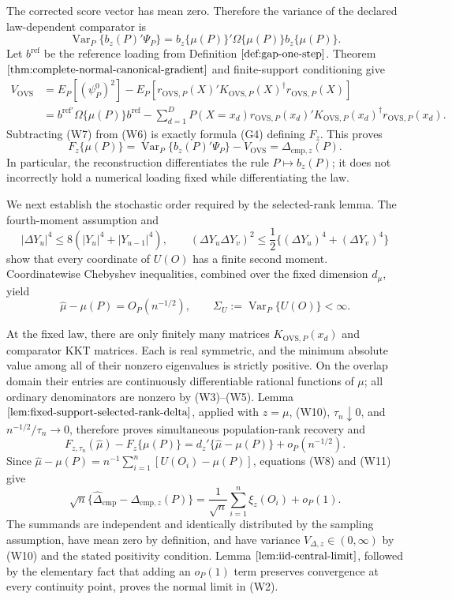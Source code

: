 The corrected score vector has mean zero.  Therefore the variance of the declared law-dependent comparator is
\[
 \operatorname{Var}_P\{b_z(P)'\Psi_P\}
 =b_z\{\mu(P)\}'\Omega\{\mu(P)\}b_z\{\mu(P)\}.
\tag{W6}
\]
Let \(b^{\mathrm{ref}}\) be the reference loading from Definition \(\ref{def:gap-one-step}\).  Theorem \(\ref{thm:complete-normal-canonical-gradient}\) and finite-support conditioning give
\[
 \begin{aligned}
 V_{\mathrm{OVS}}
 &=E_P[(\psi_P^0)^2]
 -E_P[r_{\mathrm{OVS},P}(X)'K_{\mathrm{OVS},P}(X)^\dagger
 r_{\mathrm{OVS},P}(X)]\\
 &=b^{\mathrm{ref}\prime}\Omega\{\mu(P)\}b^{\mathrm{ref}}
 -\sum_{d=1}^D P(X=x_d)
 r_{\mathrm{OVS},P}(x_d)'K_{\mathrm{OVS},P}(x_d)^\dagger
 r_{\mathrm{OVS},P}(x_d).
 \end{aligned}
\tag{W7}
\]
Subtracting (W7) from (W6) is exactly formula (G4) defining \(F_z\).  This proves
\[
 F_z\{\mu(P)\}
 =\operatorname{Var}_P\{b_z(P)'\Psi_P\}-V_{\mathrm{OVS}}
 =\Delta_{\mathrm{cmp},z}(P).
\tag{W8}
\]
In particular, the reconstruction differentiates the rule \(P\mapsto b_z(P)\); it does not incorrectly hold a numerical loading fixed while differentiating the law.

We next establish the stochastic order required by the selected-rank lemma.  The fourth-moment assumption and
\[
 |\Delta Y_u|^4\le 8(|Y_u|^4+|Y_{u-1}|^4),
 \qquad
 (\Delta Y_u\Delta Y_v)^2
 \le\frac12\{(\Delta Y_u)^4+(\Delta Y_v)^4\}
\tag{W9}
\]
show that every coordinate of \(U(O)\) has a finite second moment.  Coordinatewise Chebyshev inequalities, combined over the fixed dimension \(d_\mu\), yield
\[
 \widehat\mu-\mu(P)=O_P(n^{-1/2}),
 \qquad
 \Sigma_U:=\operatorname{Var}_P\{U(O)\}<\infty.
\tag{W10}
\]

At the fixed law, there are only finitely many matrices \(K_{\mathrm{OVS},P}(x_d)\) and comparator KKT matrices.  Each is real symmetric, and the minimum absolute value among all of their nonzero eigenvalues is strictly positive.  On the overlap domain their entries are continuously differentiable rational functions of \(\mu\); all ordinary denominators are nonzero by (W3)--(W5).  Lemma \(\ref{lem:fixed-support-selected-rank-delta}\), applied with \(z=\mu\), (W10), \(\tau_n\downarrow0\), and \(n^{-1/2}/\tau_n\to0\), therefore proves simultaneous population-rank recovery and
\[
 F_{z,\tau_n}(\widehat\mu)-F_z\{\mu(P)\}
 =d_z'\{\widehat\mu-\mu(P)\}+o_P(n^{-1/2}).
\tag{W11}
\]
Since \(\widehat\mu-\mu(P)=n^{-1}\sum_{i=1}^n[U(O_i)-\mu(P)]\), equations (W8) and (W11) give
\[
 \sqrt n\{\widehat\Delta_{\mathrm{cmp}}-\Delta_{\mathrm{cmp},z}(P)\}
 =\frac1{\sqrt n}\sum_{i=1}^n\xi_z(O_i)+o_P(1).
\tag{W12}
\]
The summands are independent and identically distributed by the sampling assumption, have mean zero by definition, and have variance \(V_{\Delta,z}\in(0,\infty)\) by (W10) and the stated positivity condition.  Lemma \(\ref{lem:iid-central-limit}\), followed by the elementary fact that adding an \(o_P(1)\) term preserves convergence at every continuity point, proves the normal limit in (W2).

